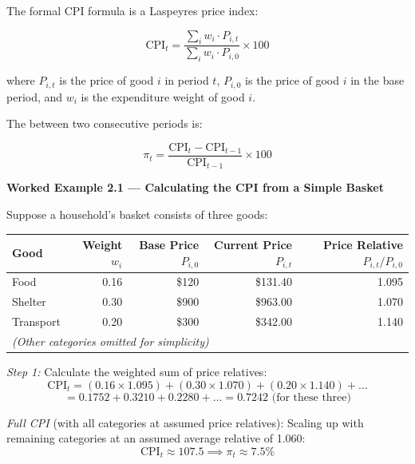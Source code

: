 The formal CPI formula is a Laspeyres price index:

\begin{equation}
  \text{CPI}_t = \frac{\displaystyle\sum_{i} w_i \cdot P_{i,t}}
                      {\displaystyle\sum_{i} w_i \cdot P_{i,0}}
                 \times 100
  \label{eq:cpi_formula}
\end{equation}

\noindent where $P_{i,t}$ is the price of good $i$ in period $t$,
$P_{i,0}$ is the price of good $i$ in the base period, and $w_i$ is the
expenditure weight of good $i$.

The  between two consecutive periods is:

\begin{equation}
  \pi_t = \frac{\text{CPI}_t - \text{CPI}_{t-1}}{\text{CPI}_{t-1}} \times 100
  \label{eq:inflation_rate}
\end{equation}

\noindent\textbf{Worked Example 2.1 --- Calculating the CPI from a Simple Basket}

Suppose a household's basket consists of three goods:

\begin{center}
\renewcommand{\arraystretch}{1.3}
\begin{tabular}{lrrrr}
\toprule
Good & Weight $w_i$ & Base Price $P_{i,0}$ & Current Price $P_{i,t}$
     & Price Relative $P_{i,t}/P_{i,0}$ \\
\midrule
Food       & 0.16 & \$120 & \$131.40 & 1.095 \\
Shelter    & 0.30 & \$900 & \$963.00 & 1.070 \\
Transport  & 0.20 & \$300 & \$342.00 & 1.140 \\
\midrule
\multicolumn{5}{l}{\textit{(Other categories omitted for simplicity)}} \\
\bottomrule
\end{tabular}
\end{center}

\noindent\textit{Step 1:} Calculate the weighted sum of price relatives:
\[
  \text{CPI}_t = (0.16 \times 1.095) + (0.30 \times 1.070)
                + (0.20 \times 1.140) + \ldots
\]
\[
  = 0.1752 + 0.3210 + 0.2280 + \ldots = 0.7242 \text{ (for these three)}
\]

\noindent\textit{Full CPI} (with all categories at assumed price relatives):
Scaling up with remaining categories at an assumed average relative of 1.060:
\[
  \text{CPI}_t \approx 107.5 \implies \pi_t \approx 7.5\%
\]

